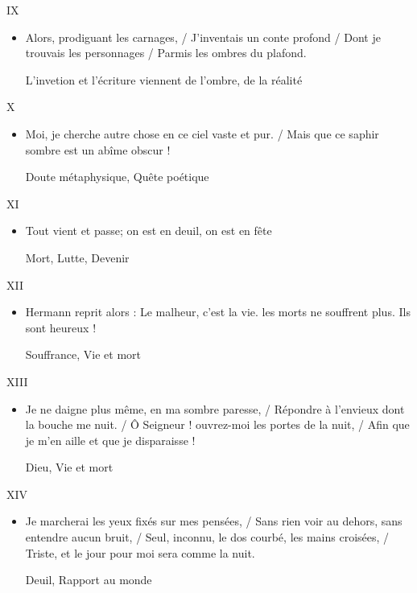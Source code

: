 \documentclass[french,a4paper,11pt,answers]{exam}
\newcommand{\cit}[2]{\og #1 \fg{} \begin{solution}{ #2 }\end{solution}} %
\begin{document}
	\begin{cadre}{IX}
		\begin{itemize}
			\item \cit{Alors, prodiguant les carnages, / J'inventais un conte profond / Dont je trouvais les personnages / Parmis les ombres du plafond.}{L'invetion et l'écriture viennent de l'ombre, de la réalité}
		\end{itemize}
	\end{cadre}
	
	\begin{cadre}{X}
		\begin{itemize}
			\item \cit{Moi, je cherche autre chose en ce ciel vaste et pur. / Mais que ce saphir sombre est un abîme obscur !}{Doute métaphysique, Quête poétique}
		\end{itemize}
	\end{cadre}
	
	\begin{cadre}{XI}
		\begin{itemize}
			\item \cit{Tout vient et passe; on est en deuil, on est en fête}{Mort, Lutte, Devenir}
		\end{itemize}
	\end{cadre}
	
	\begin{cadre}{XII}
		\begin{itemize}
			\item \cit{Hermann reprit alors : \og Le malheur, c'est la vie. les morts ne souffrent plus. Ils sont heureux ! \fg}{Souffrance, Vie et mort}
		\end{itemize}
	\end{cadre}
	
	\begin{cadre}{XIII}
		\begin{itemize}
			\item \cit{Je ne daigne plus même, en ma sombre paresse, / Répondre à l'envieux dont la bouche me nuit. / Ô Seigneur ! ouvrez-moi les portes de la nuit, / Afin que je m'en aille et que je disparaisse !}{Dieu, Vie et mort}
		\end{itemize}
	\end{cadre}
	
	\begin{cadre}{XIV}
		\begin{itemize}
			\item \cit{Je marcherai les yeux fixés sur mes pensées, / Sans rien voir au dehors, sans entendre aucun bruit, / Seul, inconnu, le dos courbé, les mains croisées, / Triste, et le jour pour moi sera comme la nuit.}{Deuil, Rapport au monde}
		\end{itemize}
	\end{cadre}
	
\end{document}
